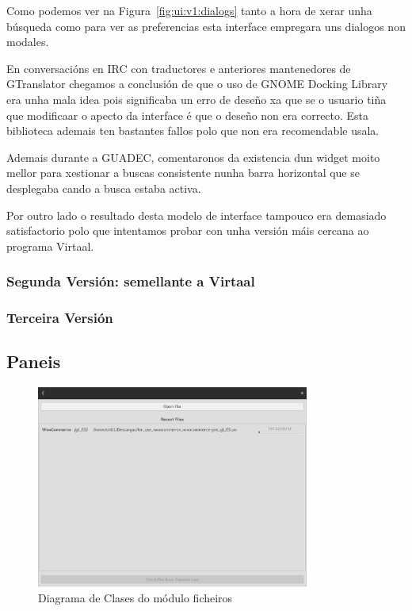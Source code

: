 Como podemos ver na Figura~\ref{fig:ui:v1:dialogs} tanto a hora de xerar unha búsqueda como para ver as preferencias esta interface empregara uns dialogos non modales.

En conversacións en IRC con traductores e anteriores mantenedores de GTranslator chegamos a conclusión de que o uso de GNOME Docking Library era unha mala idea pois significaba un erro de deseño xa que se o usuario tiña que modificaar o apecto da interface é que o deseño non era correcto. Esta biblioteca ademais ten bastantes fallos polo que non era recomendable usala.

Ademais durante a GUADEC, comentaronos da existencia dun widget moito mellor para xestionar a buscas consistente nunha barra horizontal que se desplegaba cando a busca estaba activa.

Por outro lado o resultado desta modelo de interface tampouco era demasiado satisfactorio polo que intentamos probar con unha versión máis cercana ao programa Virtaal.

\subsubsection{Segunda Versión: semellante a Virtaal}
\subsubsection{Terceira Versión}

\subsection{Paneis}

\begin{figure}[h!]
  \centering
    \includegraphics[width=0.8\textwidth]{img/panel_abrir_ficheiro.png}
    \caption{Diagrama de Clases do módulo ficheiros}
    \label{fig:dia_class:files}
\end{figure}


